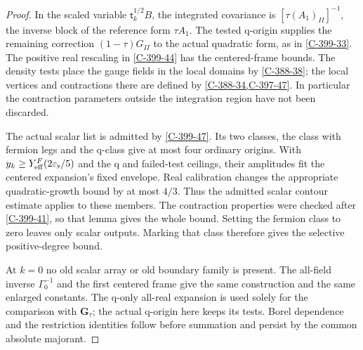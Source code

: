\documentclass[11pt,letterpaper,reqno]{amsart}
\theoremstyle{definition}
\theoremstyle{remark}
\begin{document}
\begin{proof}
In the scaled variable $\mathsf t_k^{1/2}B$, the integrated
covariance is $[\tau(A_1)_{II}]^{-1}$, the inverse block
of the reference form $\tau A_1$. The tested q-origin
supplies the remaining correction $(1-\tau)G_{II}$ to the
actual quadratic form, as in \cref{C-399-33}.
The positive real rescaling in \cref{C-399-44}
has the centered-frame bounds. The density tests
place the gauge fields in the local domains by
\cref{C-388-38}; the local vertices and contractions
there are defined by \cref{C-388-34,C-397-47}.
In particular the contraction parameters outside the
integration region have not been discarded.

The actual scalar list is admitted by \cref{C-399-47}.
Its two classes, the class with fermion legs and the
q-class give at most four ordinary origins. With
$y_k\ge Y_{\rm eff}^F(2\varepsilon_\flat/5)$ and the
q and failed-test ceilings, their amplitudes fit the
centered expansion's fixed envelope. Real calibration
changes the appropriate quadratic-growth bound by at
most $4/3$. Thus the admitted scalar contour estimate
applies to these members. The contraction properties
were checked after \cref{C-399-41}, so that lemma gives
the whole bound. Setting the fermion class to zero
leaves only scalar outputs. Marking that class therefore
gives the selective positive-degree bound.

At $k=0$ no old scalar array or old boundary family is
present. The all-field inverse $\Gamma_0^{-1}$ and the
first centered frame give the same construction and
the same enlarged constants. The q-only all-real
expansion is used solely for the comparison with
$\mathbf G_\tau$; the actual q-origin here keeps its
tests. Borel dependence and the restriction identities
follow before summation and persist by the common
absolute majorant.
\end{proof}
\end{document}
